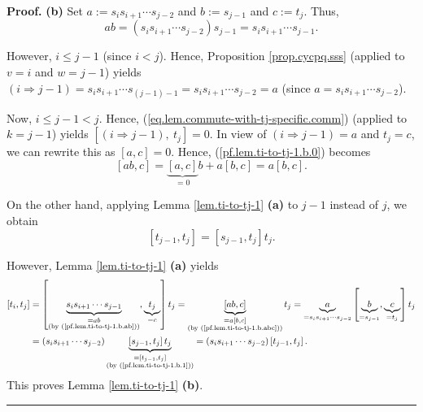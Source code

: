 \documentclass[numbers=enddot,12pt,final,onecolumn,notitlepage]{scrartcl}%
\theoremstyle{definition}
\newenvironment{proof}[1][Proof]{\noindent\textbf{#1.} }{\ \rule{0.5em}{0.5em}}
\begin{document}
\begin{proof}
\textbf{(b)} Set $a:=s_{i}s_{i+1}\cdots s_{j-2}$ and $b:=s_{j-1}$ and
$c:=t_{j}$. Thus,%
\begin{equation}
ab=\left(  s_{i}s_{i+1}\cdots s_{j-2}\right)  s_{j-1}=s_{i}s_{i+1}\cdots
s_{j-1}. \label{pf.lem.ti-to-tj-1.b.ab}%
\end{equation}


However, $i\leq j-1$ (since $i<j$). Hence, Proposition \ref{prop.cycpq.sss}
(applied to $v=i$ and $w=j-1$) yields $\left(  i\Longrightarrow j-1\right)
=s_{i}s_{i+1}\cdots s_{\left(  j-1\right)  -1}=s_{i}s_{i+1}\cdots s_{j-2}=a$
(since $a=s_{i}s_{i+1}\cdots s_{j-2}$).

Now, $i\leq j-1<j$. Hence, (\ref{eq.lem.commute-with-tj-specific.comm})
(applied to $k=j-1$) yields $\left[  \left(  i\Longrightarrow j-1\right)
,\ t_{j}\right]  =0$. In view of $\left(  i\Longrightarrow j-1\right)  =a$ and
$t_{j}=c$, we can rewrite this as $\left[  a,c\right]  =0$. Hence,
(\ref{pf.lem.ti-to-tj-1.b.0}) becomes%
\begin{equation}
\left[  ab,c\right]  =\underbrace{\left[  a,c\right]  }_{=0}b+a\left[
b,c\right]  =a\left[  b,c\right]  . \label{pf.lem.ti-to-tj-1.b.abc}%
\end{equation}


On the other hand, applying Lemma \ref{lem.ti-to-tj-1} \textbf{(a)} to $j-1$
instead of $j$, we obtain
\begin{equation}
\left[  t_{j-1},t_{j}\right]  =\left[  s_{j-1},t_{j}\right]  t_{j}.
\label{pf.lem.ti-to-tj-1.b.1}%
\end{equation}


However, Lemma \ref{lem.ti-to-tj-1} \textbf{(a)} yields%
\begin{align*}
\left[  t_{i},t_{j}\right]   &  =\left[  \underbrace{s_{i}s_{i+1}\cdots
s_{j-1}}_{\substack{=ab\\\text{(by (\ref{pf.lem.ti-to-tj-1.b.ab}))}%
}},\underbrace{t_{j}}_{=c}\right]  t_{j}=\underbrace{\left[  ab,c\right]
}_{\substack{=a\left[  b,c\right]  \\\text{(by (\ref{pf.lem.ti-to-tj-1.b.abc}%
))}}}t_{j}=\underbrace{a}_{=s_{i}s_{i+1}\cdots s_{j-2}}\left[  \underbrace{b}%
_{=s_{j-1}},\underbrace{c}_{=t_{j}}\right]  t_{j}\\
&  =\left(  s_{i}s_{i+1}\cdots s_{j-2}\right)  \underbrace{\left[
s_{j-1},t_{j}\right]  t_{j}}_{\substack{=\left[  t_{j-1},t_{j}\right]
\\\text{(by (\ref{pf.lem.ti-to-tj-1.b.1}))}}}=\left(  s_{i}s_{i+1}\cdots
s_{j-2}\right)  \left[  t_{j-1},t_{j}\right]  .
\end{align*}
This proves Lemma \ref{lem.ti-to-tj-1} \textbf{(b)}.
\end{proof}
\end{document}
